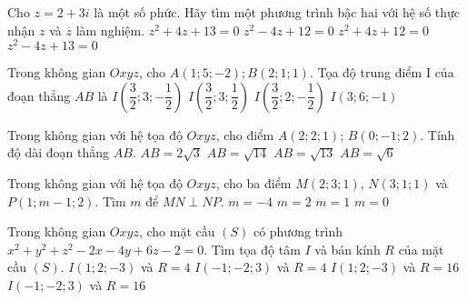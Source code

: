 \begin{ex}%
Cho $z=2+3i$ là một số phức. Hãy tìm một phương trình bậc hai với hệ số thực nhận $z$ và $\overline{z}$ làm nghiệm.
\choice
{$z^2+4z+13=0$}
{$z^2-4z+12=0$}
{$z^2+4z+12=0$}
{\True $z^2-4z+13=0$}
\end{ex}
\begin{ex}%
Trong không gian $Oxyz$, cho $A(1;5;-2);B(2;1;1)$. Tọa độ trung điểm I của đoạn thẳng $AB$ là
\choice
{\True $I\left(\dfrac{3}{2};3;-\dfrac{1}{2}\right)$}
{$I\left(\dfrac{3}{2};3;\dfrac{1}{2}\right)$}
{$I\left(\dfrac{3}{2};2;-\dfrac{1}{2}\right)$}
{$I\left(3;6;-1\right)$}
\end{ex}
\begin{ex}%
Trong không gian với hệ tọa độ $Oxyz$, cho điểm $A(2;2;1)$; $B(0;-1;2)$. Tính độ dài đoạn thẳng $AB$.
\choice
{$AB=2\sqrt{3}$}
{\True $AB=\sqrt{14}$}
{$AB=\sqrt{13}$}
{$AB=\sqrt{6}$}
\end{ex}
\begin{ex}%
Trong không gian với hệ tọa độ $Oxyz$, cho ba điểm $M(2;3;1)$, $ N(3;1;1)$ và $P(1;m-1;2)$. Tìm $m$ để $MN\perp NP$.
\choice
{$m=-4$}
{$m=2$}
{\True $m=1$}
{$m=0$}
\end{ex}
\begin{ex}%
Trong không gian $Oxyz$, cho mặt cầu $(S)$ có phương trình $x^2+y^2+z^2-2x-4y+6z-2=0$. Tìm tọa độ tâm $I$ và bán kính $R$ của mặt cầu $(S)$.
\choice
{\True $I(1;2;-3)$ và $R=4$}
{$I(-1;-2;3)$ và $R=4$}
{$I(1;2;-3)$ và $R=16$}
{$I(-1;-2;3)$ và $R=16$}
\end{ex}
